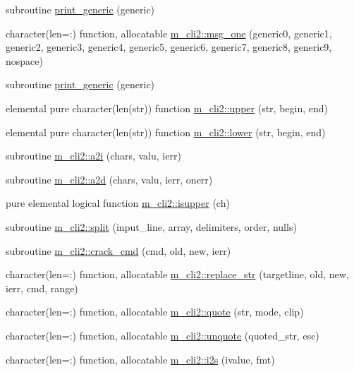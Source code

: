 \begin{DoxyCompactItemize}
\item 
subroutine \mbox{\hyperlink{M__CLI2_8f90_aaa8ee15f943d8e1543ae35ab732c3cd2}{print\+\_\+generic}} (generic)
\item 
character(len=\+:) function, allocatable \mbox{\hyperlink{namespacem__cli2_a368e9aaa556f69228e7f0837bd558b82}{m\+\_\+cli2\+::msg\+\_\+one}} (generic0, generic1, generic2, generic3, generic4, generic5, generic6, generic7, generic8, generic9, nospace)
\item 
subroutine \mbox{\hyperlink{M__CLI2_8f90_a9d5e1620d474ac03a74eeb9b0f7d6ae1}{print\+\_\+generic}} (generic)
\item 
elemental pure character(len(str)) function \mbox{\hyperlink{namespacem__cli2_afa7a2419002024ff6d950c5d905ddd7a}{m\+\_\+cli2\+::upper}} (str, begin, end)
\item 
elemental pure character(len(str)) function \mbox{\hyperlink{namespacem__cli2_a6d2d93ab8471667e632bf7a0e95ebd13}{m\+\_\+cli2\+::lower}} (str, begin, end)
\item 
subroutine \mbox{\hyperlink{namespacem__cli2_a0be58233adafc0bf10dfe69300a05b9f}{m\+\_\+cli2\+::a2i}} (chars, valu, ierr)
\item 
subroutine \mbox{\hyperlink{namespacem__cli2_ad9e1de0ea9d2b4ed758b2a76bf143bd2}{m\+\_\+cli2\+::a2d}} (chars, valu, ierr, onerr)
\item 
pure elemental logical function \mbox{\hyperlink{namespacem__cli2_ad33ebc8ed3953d8cd91bd8c90a49b59d}{m\+\_\+cli2\+::isupper}} (ch)
\item 
subroutine \mbox{\hyperlink{namespacem__cli2_a6578e29ee4dc56651528e7e0acd29665}{m\+\_\+cli2\+::split}} (input\+\_\+line, array, delimiters, order, nulls)
\item 
subroutine \mbox{\hyperlink{namespacem__cli2_a710b26995119aee101959555b1bac8e2}{m\+\_\+cli2\+::crack\+\_\+cmd}} (cmd, old, new, ierr)
\item 
character(len=\+:) function, allocatable \mbox{\hyperlink{namespacem__cli2_a8f65cf1b227d837d89437368c660666f}{m\+\_\+cli2\+::replace\+\_\+str}} (targetline, old, new, ierr, cmd, range)
\item 
character(len=\+:) function, allocatable \mbox{\hyperlink{namespacem__cli2_a63f81a2c027eb5f3e0a77167ac29fc73}{m\+\_\+cli2\+::quote}} (str, mode, clip)
\item 
character(len=\+:) function, allocatable \mbox{\hyperlink{namespacem__cli2_a9cab7352414f8b5625330a9ff5cf0cb4}{m\+\_\+cli2\+::unquote}} (quoted\+\_\+str, esc)
\item 
character(len=\+:) function, allocatable \mbox{\hyperlink{namespacem__cli2_aa106d3533fd6d4845f0b3e94b2a79ffb}{m\+\_\+cli2\+::i2s}} (ivalue, fmt)

\end{DoxyCompactItemize}
